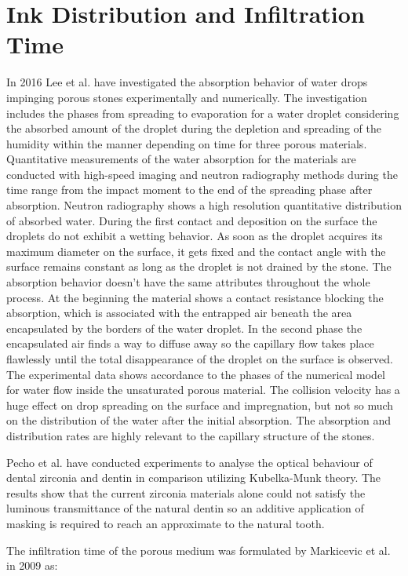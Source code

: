 \section{Ink Distribution and Infiltration Time}
In 2016 Lee et al. have investigated the absorption behavior of water drops impinging porous stones experimentally and numerically. The investigation includes the phases from spreading to evaporation for a water droplet considering the absorbed amount of the droplet during the depletion and spreading of the humidity within the manner depending on time for three porous materials. Quantitative measurements of the water absorption for the materials are conducted with high-speed imaging and neutron radiography methods during the time range from the impact moment to the end of the spreading phase after absorption. Neutron radiography shows a high resolution quantitative distribution of absorbed water. During the first contact and deposition on the surface the droplets do not exhibit a wetting behavior.  As soon as the droplet acquires its maximum diameter on the surface, it gets fixed and the contact angle with the surface remains constant as long as the droplet is not drained by the stone. The absorption behavior doesn’t have the same attributes throughout the whole process. At the beginning the material shows a contact resistance blocking the absorption, which is associated with the entrapped air beneath the area encapsulated by the borders of the water droplet. In the second phase the encapsulated air finds a way to diffuse away so the capillary flow takes place flawlessly until the total disappearance of the droplet on the surface is observed. The experimental data shows accordance to the phases of the numerical model for water flow inside the unsaturated porous material. The collision velocity has a huge effect on drop spreading on the surface and impregnation, but not so much on the distribution of the water after the initial absorption. The absorption and distribution rates are highly relevant to the capillary structure of the stones.\citep{lee2016absorption}


Pecho et al. have conducted experiments to analyse the optical behaviour of dental zirconia and dentin in comparison utilizing Kubelka-Munk theory. The results show that the current zirconia materials alone could not satisfy the luminous transmittance of the natural dentin so an additive application of masking is required to reach an approximate to the natural tooth.\citep{pecho2015optical}

The infiltration time of the porous medium was formulated by Markicevic et al. in 2009 as:

